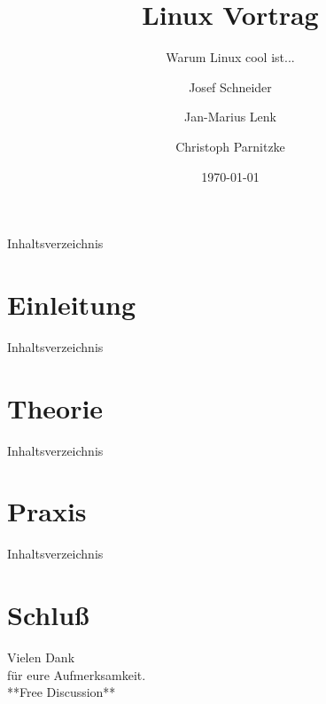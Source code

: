 \documentclass[12pt,utf8]{beamer}
\title{Linux Vortrag}
\subtitle{Warum Linux cool ist...}
\author[J. Schneider]{Josef Schneider}
\author[J.-M. Lenk]{Jan-Marius Lenk}
\author[C. Parnitzke]{Christoph Parnitzke}
\institute[FOSS AG - FbI]{Free and Open Source Software AG\\ Fachbereich Informatik}
\date{\today}
\begin{document}
\begin{frame}
	\titlepage
\end{frame}

\begin{frame}[TU]{Inhaltsverzeichnis}
	\tableofcontents[hideallsubsections]
\end{frame}

\section{Einleitung}

\begin{frame}{Inhaltsverzeichnis}
\end{frame}




\section{Theorie}

\begin{frame}{Inhaltsverzeichnis}
\end{frame}




\section{Praxis}

\begin{frame}{Inhaltsverzeichnis}
\end{frame}




\section{Schluß}




\begin{frame}
\vfill
\begin{center}\begin{Huge}Vielen Dank \\
für eure Aufmerksamkeit. \\[50pt]
**Free Discussion**\end{Huge}\vfill
\end{center}
\vfill
\end{frame}
\end{document}

